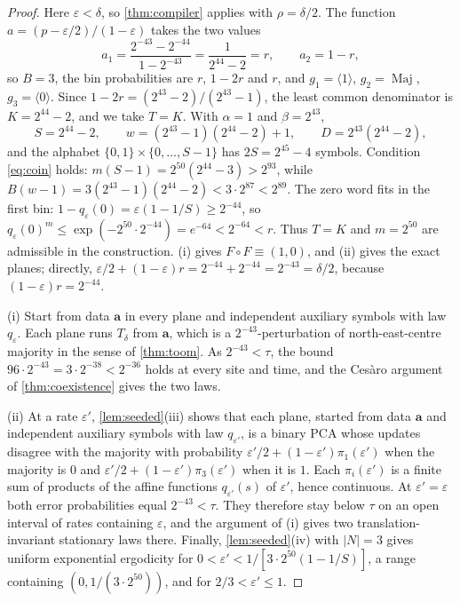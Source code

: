 \documentclass[11pt]{article}
\theoremstyle{plain}
\theoremstyle{definition}
\theoremstyle{remark}
\newcommand{\eps}{\varepsilon}
\newcommand{\Maj}{\operatorname{Maj}}
\begin{document}
\begin{proof}
Here $\eps<\delta$, so \cref{thm:compiler} applies with $\rho=\delta/2$. The function $a=(p-\eps/2)/(1-\eps)$ takes the two values
\[
 a_1=\frac{2^{-43}-2^{-44}}{1-2^{-43}}=\frac{1}{2^{44}-2}=r,\qquad a_2=1-r,
\]
so $B=3$, the bin probabilities are $r$, $1-2r$ and $r$, and $g_1=\langle1\rangle$, $g_2=\Maj$, $g_3=\langle0\rangle$. Since $1-2r=(2^{43}-2)/(2^{43}-1)$, the least common denominator is $K=2^{44}-2$, and we take $T=K$. With $\alpha=1$ and $\beta=2^{43}$,
\[
 S=2^{44}-2,\qquad w=(2^{43}-1)(2^{44}-2)+1,\qquad D=2^{43}(2^{44}-2),
\]
and the alphabet $\{0,1\}\times\{0,\ldots,S-1\}$ has $2S=2^{45}-4$ symbols. Condition \eqref{eq:coin} holds: $m(S-1)=2^{50}(2^{44}-3)>2^{93}$, while $B(w-1)=3(2^{43}-1)(2^{44}-2)<3\cdot2^{87}<2^{89}$. The zero word fits in the first bin: $1-q_\eps(0)=\eps(1-1/S)\geq2^{-44}$, so $q_\eps(0)^m\leq\exp(-2^{50}\cdot2^{-44})=e^{-64}<2^{-64}<r$. Thus $T=K$ and $m=2^{50}$ are admissible in the construction. (i) gives $F\circ F\equiv(1,0)$, and (ii) gives the exact planes; directly, $\eps/2+(1-\eps)r=2^{-44}+2^{-44}=2^{-43}=\delta/2$, because $(1-\eps)r=2^{-44}$.

(i) Start from data $\mathbf a$ in every plane and independent auxiliary symbols with law $q_\eps$. Each plane runs $T_\delta$ from $\mathbf a$, which is a $2^{-43}$-perturbation of north-east-centre majority in the sense of \cref{thm:toom}. As $2^{-43}<\tau$, the bound $96\cdot2^{-43}=3\cdot2^{-38}<2^{-36}$ holds at every site and time, and the Ces\`aro argument of \cref{thm:coexistence} gives the two laws.

(ii) At a rate $\eps'$, \cref{lem:seeded}(iii) shows that each plane, started from data $\mathbf a$ and independent auxiliary symbols with law $q_{\eps'}$, is a binary PCA whose updates disagree with the majority with probability $\eps'/2+(1-\eps')\pi_1(\eps')$ when the majority is $0$ and $\eps'/2+(1-\eps')\pi_3(\eps')$ when it is $1$. Each $\pi_i(\eps')$ is a finite sum of products of the affine functions $q_{\eps'}(s)$ of $\eps'$, hence continuous. At $\eps'=\eps$ both error probabilities equal $2^{-43}<\tau$. They therefore stay below $\tau$ on an open interval of rates containing $\eps$, and the argument of (i) gives two translation-invariant stationary laws there. Finally, \cref{lem:seeded}(iv) with $|N|=3$ gives uniform exponential ergodicity for $0<\eps'<1/[3\cdot2^{50}(1-1/S)]$, a range containing $(0,1/(3\cdot2^{50}))$, and for $2/3<\eps'\leq1$.
\end{proof}
\end{document}
